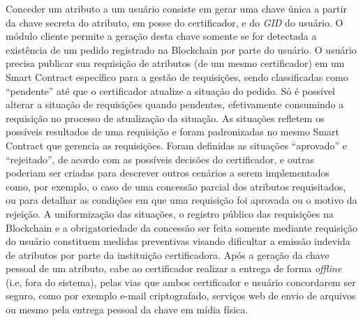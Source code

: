 \documentclass[a4paper,11pt]{article}
\begin{document}
Conceder um atributo a um usuário consiste em gerar uma chave única a partir da chave secreta do atributo, em posse do certificador, e do \emph{GID} do usuário.
O módulo cliente permite a geração desta chave somente se for detectada a existência de um pedido registrado na Blockchain por parte do usuário.
O usuário precisa publicar sua requisição de atributos (de um mesmo certificador) em um Smart Contract específico para a gestão de requisições, sendo classificadas como ``pendente'' até que o certificador atualize a situação do pedido.
Só é possível alterar a situação de requisições quando pendentes, efetivamente consumindo a requisição no processo de atualização da situação.
As situações refletem os possíveis resultados de uma requisição e foram padronizadas no mesmo Smart Contract que gerencia as requisições.
Foram definidas as situações ``aprovado'' e ``rejeitado'', de acordo com as possíveis decisões do certificador, e outras poderiam ser criadas para descrever outros cenários a serem implementados como, por exemplo, o caso de uma concessão parcial dos atributos requisitados, ou para detalhar as condições em que uma requisição foi aprovada ou o motivo da rejeição.
A uniformização das situações, o registro público das requisições na Blockchain e a obrigatoriedade da concessão ser feita somente mediante requisição do usuário constituem medidas preventivas visando dificultar a emissão indevida de atributos por parte da instituição certificadora.
Após a geração da chave pessoal de um atributo, cabe ao certificador realizar a entrega de forma \emph{offline} (i.e, fora do sistema), pelas vias que ambos certificador e usuário concordarem ser seguro, como por exemplo e-mail criptografado, serviços web de envio de arquivos ou mesmo pela entrega pessoal da chave em mídia física.

\end{document}
